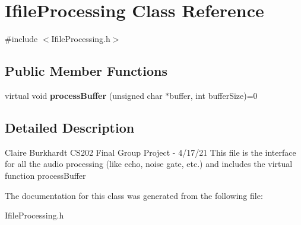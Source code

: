 \hypertarget{classIfileProcessing}{}\section{Ifile\+Processing Class Reference}
\label{classIfileProcessing}


{\ttfamily \#include $<$Ifile\+Processing.\+h$>$}

\subsection*{Public Member Functions}
\begin{DoxyCompactItemize}
\item 
\mbox{\label{classIfileProcessing_a9df8870f8349eae5834d566ca985a4e9}} 
virtual void {\bfseries process\+Buffer} (unsigned char $\ast$buffer, int buffer\+Size)=0
\end{DoxyCompactItemize}


\subsection{Detailed Description}
Claire Burkhardt C\+S202 Final Group Project -\/ 4/17/21 This file is the interface for all the audio processing (like echo, noise gate, etc.) and includes the virtual function process\+Buffer 

The documentation for this class was generated from the following file\+:\begin{DoxyCompactItemize}
\item 
Ifile\+Processing.\+h\end{DoxyCompactItemize}

